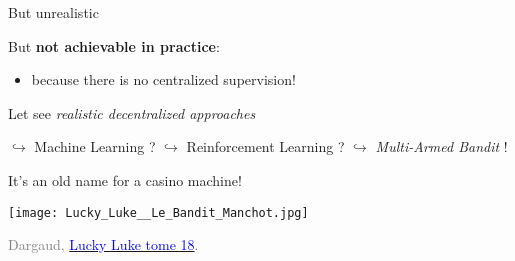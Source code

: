 \begin{frameO}

    \begin{colorblock}{But unrealistic}

        But \textbf{not achievable in practice}:
        \begin{itemize}
            \item
                  \alert{because there is no centralized supervision!}
        \end{itemize}

    \end{colorblock}

    \vspace*{30pt}

    \begin{colorblock}{Let see \emph{realistic decentralized approaches}}

        \(\hookrightarrow\) Machine Learning ? \newline
        \hspace*{15pt}\(\hookrightarrow\) Reinforcement Learning ? \newline
        \hspace*{30pt} \(\hookrightarrow\) \emph{Multi-Armed Bandit} !

    \end{colorblock}

\end{frameO}



\begin{frameO}
    \begin{center}
        It's an old name for a casino machine!
    \end{center}

    \begin{center}
        \texttt{[image: Lucky\_Luke\_\_Le\_Bandit\_Manchot.jpg]}

        \begin{tiny}
            \textcolor{gray}{
                \textcopyright{} Dargaud,
                \href{https://www.dargaud.com/bd/LUCKY-LUKE/Lucky-Luke/Lucky-Luke-tome-18-Bandit-manchot-Le}{\textcolor{blue}{Lucky Luke tome 18}}.
            }
        \end{tiny}
    \end{center}
\end{frameO}



